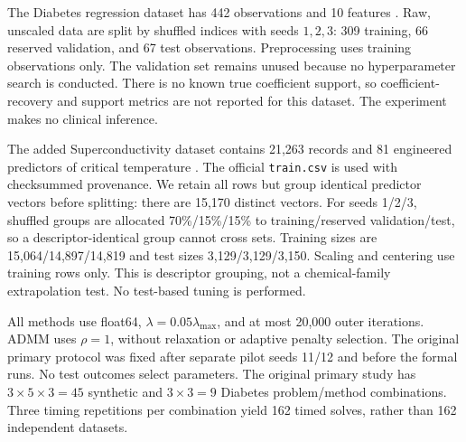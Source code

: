\documentclass{article}
\begin{document}
The Diabetes regression dataset has 442 observations and 10 features \citep{sklearndata}. Raw, unscaled data are split by shuffled indices with seeds $1,2,3$: 309 training, 66 reserved validation, and 67 test observations. Preprocessing uses training observations only. The validation set remains unused because no hyperparameter search is conducted. There is no known true coefficient support, so coefficient-recovery and support metrics are not reported for this dataset. The experiment makes no clinical inference.

The added Superconductivity dataset contains 21,263 records and 81 engineered predictors of critical temperature \citep{hamidieh2018}. The official \texttt{train.csv} is used with checksummed provenance. We retain all rows but group identical predictor vectors before splitting: there are 15,170 distinct vectors. For seeds 1/2/3, shuffled groups are allocated 70\%/15\%/15\% to training/reserved validation/test, so a descriptor-identical group cannot cross sets. Training sizes are 15,064/14,897/14,819 and test sizes 3,129/3,129/3,150. Scaling and centering use training rows only. This is descriptor grouping, not a chemical-family extrapolation test. No test-based tuning is performed.

All methods use float64, $\lambda=0.05\lambda_{\max}$, and at most 20,000 outer iterations. ADMM uses $\rho=1$, without relaxation or adaptive penalty selection. The original primary protocol was fixed after separate pilot seeds 11/12 and before the formal runs. No test outcomes select parameters. The original primary study has $3\times5\times3=45$ synthetic and $3\times3=9$ Diabetes problem/method combinations. Three timing repetitions per combination yield 162 timed solves, rather than 162 independent datasets.
\end{document}
